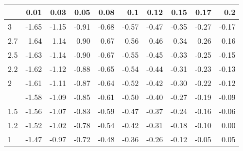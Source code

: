 
\begin{tabular}{lrrrrrrrrr}
\toprule
  & 0.01 & 0.03 & 0.05 & 0.08 & 0.1 & 0.12 & 0.15 & 0.17 & 0.2\\
\midrule
3 & -1.65 & -1.15 & -0.91 & -0.68 & -0.57 & -0.47 & -0.35 & -0.27 & -0.17\\
2.7 & -1.64 & -1.14 & -0.90 & -0.67 & -0.56 & -0.46 & -0.34 & -0.26 & -0.16\\
2.5 & -1.63 & -1.14 & -0.90 & -0.67 & -0.55 & -0.45 & -0.33 & -0.25 & -0.15\\
2.2 & -1.62 & -1.12 & -0.88 & -0.65 & -0.54 & -0.44 & -0.31 & -0.23 & -0.13\\
2 & -1.61 & -1.11 & -0.87 & -0.64 & -0.52 & -0.42 & -0.30 & -0.22 & -0.12\\
\addlinespace
1.7 & -1.58 & -1.09 & -0.85 & -0.61 & -0.50 & -0.40 & -0.27 & -0.19 & -0.09\\
1.5 & -1.56 & -1.07 & -0.83 & -0.59 & -0.47 & -0.37 & -0.24 & -0.16 & -0.06\\
1.2 & -1.52 & -1.02 & -0.78 & -0.54 & -0.42 & -0.31 & -0.18 & -0.10 & 0.00\\
1 & -1.47 & -0.97 & -0.72 & -0.48 & -0.36 & -0.26 & -0.12 & -0.05 & 0.05\\
\bottomrule
\end{tabular}
